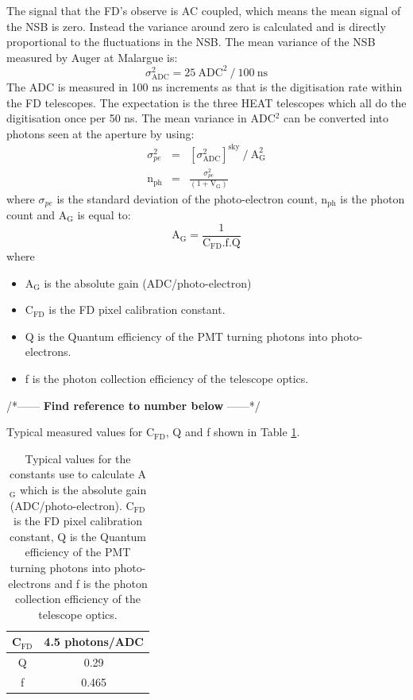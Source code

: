 The signal that the FD's observe is AC coupled, which means the mean signal of the NSB is zero. Instead the variance around zero is calculated and is directly proportional to the fluctuations in the NSB. The mean variance of the NSB measured by Auger at Malargue is:
\begin{equation}
\sigma^2_{\mathrm{ADC}} = 25 \ \mathrm{ADC}^2 \ / \ 100 \ \mathrm{ns}
\end{equation}
The ADC is measured in 100 ns increments as that is the digitisation rate within the FD telescopes. The expectation is the three HEAT telescopes which all do the digitisation once per 50 ns.  The mean variance in ADC$^2$ can be converted into photons seen at the aperture by using:
\begin{eqnarray}
\sigma^2_{pe} &=& [\sigma^2_{\mathrm{ADC}}]^{\mathrm{sky}} \ / \ \mathrm{A}^2_{\mathrm{G}} \label{eq:simgaPE} \\
\mathrm{n}_{\mathrm{ph}} &=& \frac{\sigma^2_{pe}}{(1 + \mathrm{V}_{\mathrm{G}})} \label{eq:numPhoton}
\end{eqnarray}
where $\sigma_{pe}$ is the standard deviation of the photo-electron count, n$_{\mathrm{ph}}$ is the photon count and A$_{\mathrm{G}}$ is equal to:
\begin{equation}\label{eq:abs_gain}
\mathrm{A}_{\mathrm{G}} = \frac{1}{\mathrm{C}_{\mathrm{FD}}.\mathrm{f}.\mathrm{Q}}
\end{equation}
where
\begin{itemize}
\item[] A$_{\mathrm{G}}$ is the absolute gain (ADC/photo-electron)
\item[] $\mathrm{C}_{\mathrm{FD}}$ is the FD pixel calibration constant.
\item[] Q is the Quantum efficiency of the PMT turning photons into photo-electrons.
\item[] f is the photon collection efficiency of the telescope optics.
\end{itemize}

/*------ \textbf{Find reference to number below} ------*/

Typical measured values for C$_{\mathrm{FD}}$, Q and f shown in Table \ref{tab:CFD_Q_F}.
\vspace{3mm}
\begin{table}[h]
\begin{center}
\begin{tabular}{|c|c|}
\hline 
C$_{\mathrm{FD}}$ & 4.5 photons/ADC \\
\hline
Q & 0.29 \\
\hline
f & 0.465 \\
\hline
\end{tabular} 
\end{center}
\caption{Typical values for the constants use to calculate A$_{\mathrm{G}}$ which is the absolute gain (ADC/photo-electron). $\mathrm{C}_{\mathrm{FD}}$ is the FD pixel calibration constant, Q is the Quantum efficiency of the PMT turning photons into photo-electrons and f is the photon collection efficiency of the telescope optics.} \label{tab:CFD_Q_F}
\end{table} 

